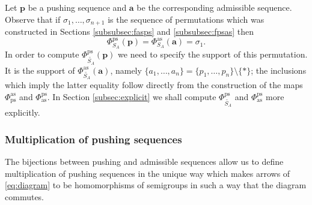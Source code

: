 \documentclass[12pt,dvips]{amsart}
\numberwithin{equation}{section} \numberwithin{figure}{section}
\theoremstyle{plain}
\theoremstyle{definition}
\theoremstyle{remark}
\newcommand{\aaa}{{\mathbf{a}}}
\newcommand{\ppp}{{\mathbf{p}}}
\newcommand{\Sn}[1]{{{S}}_{#1}}
\newcommand{\xtra}{\ast}
\newcommand{\fpsas}{\Phi^{\ps}_{\adm}}
\newcommand{\fasps}{\Phi^{\adm}_{\ps}}
\newcommand{\fass}{\Phi^{\adm}_{\PartPerm{A}}}
\newcommand{\fpss}{\Phi^{\ps}_{\PartPerm{A}}}
\newcommand{\fassSym}{\Phi^{\adm}_{\Sn{A}}}
\newcommand{\fpssSym}{\Phi^{\ps}_{\Sn{A}}}
\newcommand{\PartPerm}[1]{\widetilde{\Sn{#1}}}
\DeclareMathOperator{\adm}{as}
\DeclareMathOperator{\ps}{ps}
\begin{document}
Let $\ppp$ be a pushing sequence and $\aaa$ be the corresponding
admissible sequence. Observe that if $\sigma_1,\dots,\sigma_{n+1}$
is the sequence of permutations which was constructed in Sections
\ref{subsubsec:fasps} and \ref{subsubsec:fpsas} then
\begin{equation}
\label{eq:formulanafpss} \fpssSym(\ppp)=\fassSym(\aaa)=\sigma_1.
\end{equation}
In order to compute $\fpss(\ppp)$ we need to specify the support of
this permutation. It is the support of $\fass(\aaa)$, namely
$\{a_1,\dots,a_n\}=\{p_1,\dots,p_n\}\setminus\{\xtra\}$; the
inclusions which imply the latter equality follow directly from the
construction of the maps $\fasps$ and $\fpsas$. In Section
\ref{subsec:explicit} we shall compute $\fpss$ and $\fpsas$ more
explicitly.



\subsubsection{Multiplication of pushing sequences}
\label{subsec:multiplicationpushing} The bijections between pushing
and admissible sequences allow us to define multiplication of
pushing sequences in the unique way which makes arrows of
\eqref{eq:diagram} to be homomorphisms of semigroups in such a way
that the diagram commutes.
\end{document}
